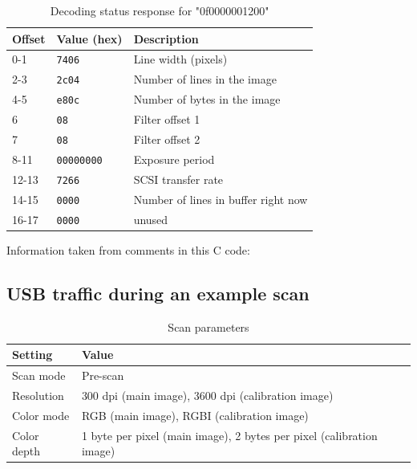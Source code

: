 \documentclass{article}
\begin{document}
\begin{table}[H]
  \caption{Decoding status response for "0f0000001200"}
  \centering
  \begin{tabularx}{\textwidth}{p{1cm} | p{2cm} | X}
    Offset & Value (hex) & Description \\ \hline
    0-1 & {\tt 7406} & Line width (pixels) \\
    2-3 & {\tt 2c04} & Number of lines in the image \\
    4-5 & {\tt e80c} & Number of bytes in the image \\
    6 & {\tt 08} & Filter offset 1 \\
    7 & {\tt 08} & Filter offset 2 \\
    8-11 & {\tt 00000000} & Exposure period \\
    12-13 & {\tt 7266} & SCSI transfer rate \\
    14-15 & {\tt 0000} & Number of lines in buffer right now \\
    16-17 & {\tt 0000} & unused \\
  \end{tabularx}
  
  \vspace{5mm}
  Information taken from comments in this C code: \cite[\texttt{pieusb\_scancmd.c}]{sane_code}
  \label{table:imageparam_query}
\end{table}


\subsection{USB traffic during an example scan}
\label{appendix_actualscan}

\begin{table}[H]
  \caption{Scan parameters}
  \centering
  \begin{tabularx}{\textwidth}{p{3cm} | X}
    Setting & Value \\ \hline
    Scan mode & Pre-scan \\
    Resolution & 300 dpi (main image), 3600 dpi (calibration image) \\
    Color mode & RGB (main image), RGBI (calibration image) \\
    Color depth & 1 byte per pixel (main image), 2 bytes per pixel (calibration image) \\
    \end{tabularx}
\end{table}
\end{document}

